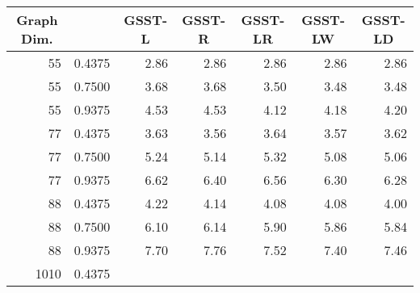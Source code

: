 \documentclass[11pt]{article}\usepackage{amsmath}
\begin{document}
\begin{center}\begin{tabular}
[c]{|c|c|c|c|c|c|c|}\hline
\textbf{Graph Dim.} &  & \textbf{GSST-L} & \textbf{GSST-R} &
\textbf{GSST-LR} & \textbf{GSST-LW} & \textbf{GSST-LD}\\\hline
\multicolumn{1}{|r|}{55} & \multicolumn{1}{|r|}{0.4375} &
\multicolumn{1}{|r|}{2.86} & \multicolumn{1}{|r|}{2.86} &
\multicolumn{1}{|r|}{2.86} & \multicolumn{1}{|r|}{2.86} &
\multicolumn{1}{|r|}{2.86}\\\hline
\multicolumn{1}{|r|}{55} & \multicolumn{1}{|r|}{0.7500} &
\multicolumn{1}{|r|}{3.68} & \multicolumn{1}{|r|}{3.68} &
\multicolumn{1}{|r|}{3.50} & \multicolumn{1}{|r|}{3.48} &
\multicolumn{1}{|r|}{3.48}\\\hline
\multicolumn{1}{|r|}{55} & \multicolumn{1}{|r|}{0.9375} &
\multicolumn{1}{|r|}{4.53} & \multicolumn{1}{|r|}{4.53} &
\multicolumn{1}{|r|}{4.12} & \multicolumn{1}{|r|}{4.18} &
\multicolumn{1}{|r|}{4.20}\\\hline
\multicolumn{1}{|r|}{77} & \multicolumn{1}{|r|}{0.4375} &
\multicolumn{1}{|r|}{3.63} & \multicolumn{1}{|r|}{3.56} &
\multicolumn{1}{|r|}{3.64} & \multicolumn{1}{|r|}{3.57} &
\multicolumn{1}{|r|}{3.62}\\\hline
\multicolumn{1}{|r|}{77} & \multicolumn{1}{|r|}{0.7500} &
\multicolumn{1}{|r|}{5.24} & \multicolumn{1}{|r|}{5.14} &
\multicolumn{1}{|r|}{5.32} & \multicolumn{1}{|r|}{5.08} &
\multicolumn{1}{|r|}{5.06}\\\hline
\multicolumn{1}{|r|}{77} & \multicolumn{1}{|r|}{0.9375} &
\multicolumn{1}{|r|}{6.62} & \multicolumn{1}{|r|}{6.40} &
\multicolumn{1}{|r|}{6.56} & \multicolumn{1}{|r|}{6.30} &
\multicolumn{1}{|r|}{6.28}\\\hline
\multicolumn{1}{|r|}{88} & \multicolumn{1}{|r|}{0.4375} &
\multicolumn{1}{|r|}{4.22} & \multicolumn{1}{|r|}{4.14} &
\multicolumn{1}{|r|}{4.08} & \multicolumn{1}{|r|}{4.08} &
\multicolumn{1}{|r|}{4.00}\\\hline
\multicolumn{1}{|r|}{88} & \multicolumn{1}{|r|}{0.7500} &
\multicolumn{1}{|r|}{6.10} & \multicolumn{1}{|r|}{6.14} &
\multicolumn{1}{|r|}{5.90} & \multicolumn{1}{|r|}{5.86} &
\multicolumn{1}{|r|}{5.84}\\\hline
\multicolumn{1}{|r|}{88} & \multicolumn{1}{|r|}{0.9375} &
\multicolumn{1}{|r|}{7.70} & \multicolumn{1}{|r|}{7.76} &
\multicolumn{1}{|r|}{7.52} & \multicolumn{1}{|r|}{7.40} &
\multicolumn{1}{|r|}{7.46}\\\hline
\multicolumn{1}{|r|}{1010} & \multicolumn{1}{|r|}{0.4375} &

\end{tabular}
\end{center}
\end{document}
